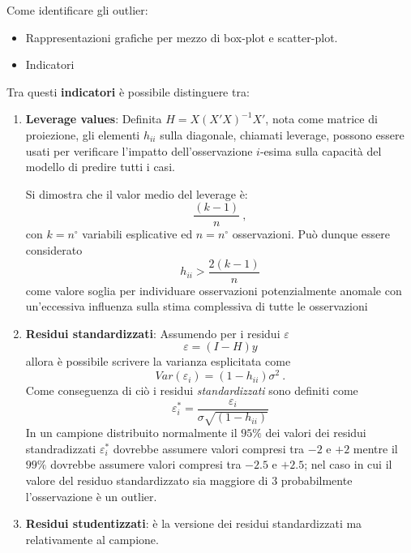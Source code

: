 \documentclass[a4page, 11pt]{article} %
\begin{document}
Come identificare gli outlier:
\begin{itemize}[noitemsep]
\item Rappresentazioni grafiche per mezzo di box-plot e scatter-plot.
\item Indicatori
\end{itemize}
Tra questi \textbf{indicatori} è possibile distinguere tra:
\begin{enumerate}
\item \textbf{Leverage values}: Definita $H = X(X'X)^{-1}X'$, nota come matrice di proiezione, gli elementi $h_{ii}$ sulla diagonale, chiamati leverage, possono essere usati per verificare l'impatto dell'osservazione $i$-esima sulla capacità del modello di predire tutti i casi.

Si dimostra che il valor medio del leverage è:
\begin{equation*} 
\frac{(k-1)}{n}\ ,
\end{equation*}
con $k = n^\circ$ variabili esplicative ed $n = n^\circ$ osservazioni.
Può dunque essere considerato 
\begin{equation*}
h_{ii} > \frac{2(k-1)}{n}
\end{equation*}
come valore soglia per individuare osservazioni potenzialmente anomale con un'eccessiva influenza sulla stima complessiva di tutte le osservazioni 
\item \textbf{Residui standardizzati}: Assumendo per i residui $\varepsilon$
\begin{equation*}
\varepsilon = (I-H)y
\end{equation*}
allora è possibile scrivere la varianza esplicitata come
\begin{equation*}
Var(\varepsilon_i) = (1-h_{ii})\sigma^2\ .
\end{equation*}
Come conseguenza di ciò i residui \textit{standardizzati} sono definiti come
\begin{equation*}
\varepsilon_i^* = \frac{\varepsilon_i}{\sigma \sqrt{(1-h_{ii})}}
\end{equation*}
In un campione distribuito normalmente il $95\%$ dei valori dei residui standradizzati $\varepsilon_i^*$ dovrebbe assumere valori compresi tra $-2$ e $+2$ mentre il $99\%$ dovrebbe assumere valori compresi tra $-2.5$ e $+2.5$; nel caso in cui il valore del residuo standardizzato sia maggiore di $3$ probabilmente l’osservazione è un outlier.
\item \textbf{Residui studentizzati}: è la versione dei residui standardizzati ma relativamente al campione.

\end{enumerate}
\end{document}
